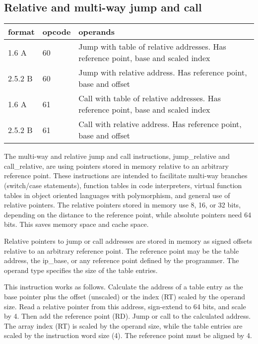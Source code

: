 \documentclass[forwardcom.tex]{subfiles}
\begin{document}
\subsection{Relative and multi-way jump and call}
\label{table:multiwayJumpCallInstructions}
\begin{tabular}{|p{14mm}|p{12mm}|p{110mm}|}
\hline
\bfseries format & \bfseries opcode & \bfseries operands \\ \hline
1.6 A   & 60 & Jump with table of relative addresses. \linebreak Has reference point, base and scaled index  \\ \hline
2.5.2 B & 60 & Jump with relative address. \linebreak Has reference point, base and offset  \\ \hline
1.6 A   & 61 & Call with table of relative addresses. \linebreak Has reference point, base and scaled index    \\ \hline
2.5.2 B & 61 & Call with relative address. \linebreak Has reference point, base and offset \\ \hline
\end{tabular}
\vv

\label{relativeJumpInstruction}
The multi-way and relative jump and call instructions, jump\_relative and call\_relative, are using pointers stored in memory relative to an arbitrary reference point. 
These instructions are intended to facilitate multi-way branches 
(switch/case statements), function tables in code interpreters, virtual function tables in object oriented languages with polymorphism, and general use of relative pointers. The relative pointers stored in memory use 8, 16, or 32 bits, depending on the distance to the reference point, while absolute pointers need 64 bits. This saves memory space and cache space. 
\vv

Relative pointers to jump or call addresses are stored in memory as signed offsets relative to an arbitrary reference point. The reference point may be the table address, the ip\_base, or any reference point defined by the programmer. The operand type specifies the size of the table entries.
\vv

This instruction works as follows. Calculate the address of a table entry as the base pointer plus the offset (unscaled) or the index (RT) scaled by the operand size. Read a relative pointer from this address, sign-extend to 64 bits, and scale by 4. Then add the reference point (RD). Jump or call to the calculated address. The array index (RT) is scaled by the operand size, while the table entries are scaled by the instruction word size (4). The reference point must be aligned by 4.
\vv
\end{document}
